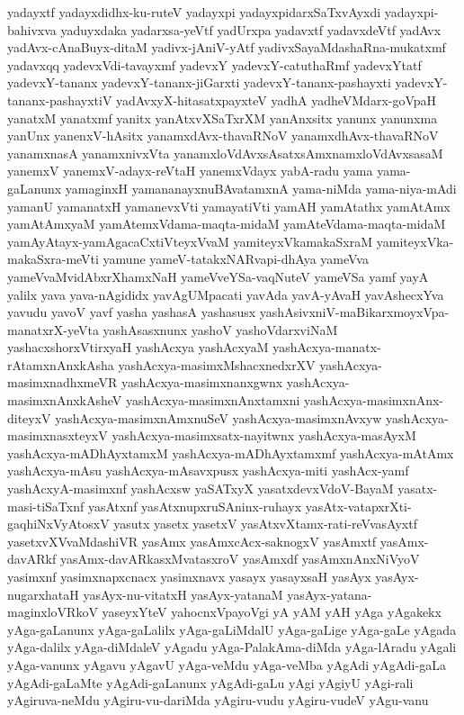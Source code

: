 {yadayxtf
yadayxdidhx-ku-ruteV
yadayxpi
yadayxpidarxSaTxvAyxdi
yadayxpi-bahivxva
yaduyxdaka
yadarxsa-yeVtf
yadUrxpa
yadavxtf
yadavxdeVtf
yadAvx
yadAvx-cAnaBuyx-ditaM
yadivx-jAniV-yAtf
yadivxSayaMdashaRna-mukatxmf
yadavxqq
yadevxVdi-tavayxmf
yadevxY
yadevxY-catuthaRmf
yadevxYtatf
yadevxY-tananx
yadevxY-tananx-jiGarxti
yadevxY-tananx-pashayxti
yadevxY-tananx-pashayxtiV
yadAvxyX-hitasatxpayxteV
yadhA
yadheVMdarx-goVpaH
yanatxM
yanatxmf
yanitx
yanAtxvXSaTxrXM
yanAnxsitx
yanunx
yanunxma
yanUnx
yanenxV-hAsitx
yanamxdAvx-thavaRNoV
yanamxdhAvx-thavaRNoV
yanamxnasA
yanamxnivxVta
yanamxloVdAvxsAsatxsAmxnamxloVdAvxsasaM
yanemxV
yanemxV-adayx-reVtaH
yanemxVdayx
yabA-radu
yama
yama-gaLanunx
yamaginxH
yamananayxnuBAvatamxnA
yama-niMda
yama-niya-mAdi
yamanU
yamanatxH
yamanevxVti
yamayatiVti
yamAH
yamAtathx
yamAtAmx
yamAtAmxyaM
yamAtemxVdama-maqta-midaM
yamAteVdama-maqta-midaM
yamAyAtayx-yamAgacaCxtiVteyxVvaM
yamiteyxVkamakaSxraM
yamiteyxVka-makaSxra-meVti
yamune
yameV-tatakxNARvapi-dhAya
yameVva
yameVvaMvidAbxrXhamxNaH
yameVveYSa-vaqNuteV
yameVSa
yamf
yayA
yalilx
yava
yava-nAgididx
yavAgUMpacati
yavAda
yavA-yAvaH
yavAshecxYva
yavudu
yavoV
yavf
yasha
yashasA
yashasusx
yashAsivxniV-maBikarxmoyxVpa-manatxrX-yeVta
yashAsasxnunx
yashoV
yashoVdarxviNaM
yashacxshorxVtirxyaH
yashAcxya
yashAcxyaM
yashAcxya-manatx-rAtamxnAnxkAsha
yashAcxya-masimxMshacxnedxrXV
yashAcxya-masimxnadhxmeVR
yashAcxya-masimxnanxgwnx
yashAcxya-masimxnAnxkAsheV
yashAcxya-masimxnAnxtamxni
yashAcxya-masimxnAnx-diteyxV
yashAcxya-masimxnAmxnuSeV
yashAcxya-masimxnAvxyw
yashAcxya-masimxnasxteyxV
yashAcxya-masimxsatx-nayitwnx
yashAcxya-masAyxM
yashAcxya-mADhAyxtamxM
yashAcxya-mADhAyxtamxmf
yashAcxya-mAtAmx
yashAcxya-mAsu
yashAcxya-mAsavxpusx
yashAcxya-miti
yashAcx-yamf
yashAcxyA-masimxnf
yashAcxsw
yaSATxyX
yasatxdevxVdoV-BayaM
yasatx-masi-tiSaTxnf
yasAtxnf
yasAtxnupxruSAninx-ruhayx
yasAtx-vatapxrXti-gaqhiNxVyAtosxV
yasutx
yasetx
yasetxV
yasAtxvXtamx-rati-reVvasAyxtf
yasetxvXVvaMdashiVR
yasAmx
yasAmxcAcx-saknogxV
yasAmxtf
yasAmx-davARkf
yasAmx-davARkasxMvatasxroV
yasAmxdf
yasAmxnAnxNiVyoV
yasimxnf
yasimxnapxcnacx
yasimxnavx
yasayx
yasayxsaH
yasAyx
yasAyx-nugarxhataH
yasAyx-nu-vitatxH
yasAyx-yatanaM
yasAyx-yatana-maginxloVRkoV
yaseyxYteV
yahocnxVpayoVgi
yA
yAM
yAH
yAga
yAgakekx
yAga-gaLanunx
yAga-gaLalilx
yAga-gaLiMdalU
yAga-gaLige
yAga-gaLe
yAgada
yAga-dalilx
yAga-diMdaleV
yAgadu
yAga-PalakAma-diMda
yAga-lAradu
yAgali
yAga-vanunx
yAgavu
yAgavU
yAga-veMdu
yAga-veMba
yAgAdi
yAgAdi-gaLa
yAgAdi-gaLaMte
yAgAdi-gaLanunx
yAgAdi-gaLu
yAgi
yAgiyU
yAgi-rali
yAgiruva-neMdu
yAgiru-vu-dariMda
yAgiru-vudu
yAgiru-vudeV
yAgu-vanu
}
